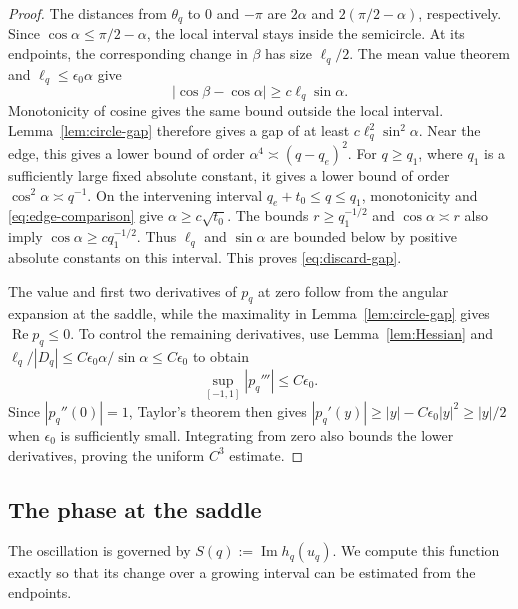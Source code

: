 \documentclass[11pt,reqno]{amsart}
\numberwithin{equation}{section}
\renewcommand{\Re}{\operatorname{Re}}
\renewcommand{\Im}{\operatorname{Im}}
\begin{document}
\begin{proof}
The distances from $\theta_q$ to $0$ and $-\pi$ are $2\alpha$
and $2(\pi/2-\alpha)$, respectively. Since
$\cos\alpha\le\pi/2-\alpha$, the local interval stays inside the
semicircle. At its endpoints, the corresponding change in $\beta$
has size $\ell_q/2$. The mean value theorem and
$\ell_q\le\epsilon_0\alpha$ give
\[
 |\cos\beta-\cos\alpha|\ge c\ell_q\sin\alpha.
\]
Monotonicity of cosine gives the same bound outside the local
interval. Lemma~\ref{lem:circle-gap} therefore gives a gap of at
least $c\ell_q^2\sin^2\alpha$.
Near the edge, this gives a lower bound of order
$\alpha^4\asymp(q-q_e)^2$.
For $q\ge q_1$, where $q_1$ is a sufficiently large fixed absolute
constant, it gives a lower bound of order
$\cos^2\alpha\asymp q^{-1}$.
On the intervening interval $q_e+t_0\le q\le q_1$, monotonicity and
\eqref{eq:edge-comparison} give $\alpha\ge c\sqrt{t_0}$.
The bounds $r\ge q_1^{-1/2}$ and $\cos\alpha\asymp r$ also imply
$\cos\alpha\ge c q_1^{-1/2}$. Thus $\ell_q$ and $\sin\alpha$ are
bounded below by positive absolute constants on this interval.
This proves \eqref{eq:discard-gap}.

The value and first two derivatives of $p_q$ at zero follow from
the angular expansion at the saddle, while the maximality in
Lemma~\ref{lem:circle-gap} gives $\Re p_q\le0$.
To control the remaining derivatives, use Lemma~\ref{lem:Hessian}
and $\ell_q/|D_q|\le C\epsilon_0\alpha/\sin\alpha\le C\epsilon_0$
to obtain
\[
 \sup_{[-1,1]}|p_q'''|\le C\epsilon_0.
\]
Since $|p_q''(0)|=1$, Taylor's theorem then gives
$|p_q'(y)|\ge|y|-C\epsilon_0|y|^2\ge|y|/2$ when $\epsilon_0$ is
sufficiently small. Integrating from zero also bounds the lower
derivatives, proving the uniform $C^3$ estimate.
\end{proof}

\subsection{The phase at the saddle}

The oscillation is governed by $S(q):=\Im h_q(u_q)$.
We compute this function exactly so that its change over a growing
interval can be estimated from the endpoints.
\end{document}
